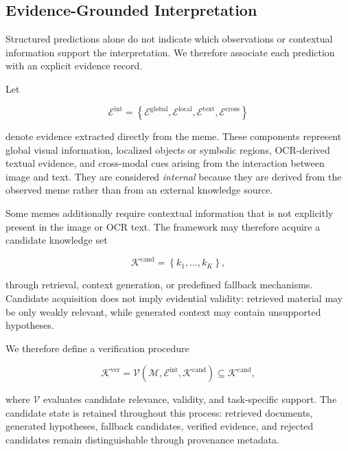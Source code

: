 \subsection{Evidence-Grounded Interpretation}
\label{sec:problem:evidence}

Structured predictions alone do not indicate which observations or
contextual information support the interpretation.
We therefore associate each prediction with an explicit evidence
record.

Let

\begin{equation}
\mathcal{E}^{\mathrm{int}}
=
\left\{
\mathcal{E}^{\mathrm{global}},
\mathcal{E}^{\mathrm{local}},
\mathcal{E}^{\mathrm{text}},
\mathcal{E}^{\mathrm{cross}}
\right\}
\label{eq:internal_evidence}
\end{equation}

denote evidence extracted directly from the meme.
These components represent global visual information, localized
objects or symbolic regions, OCR-derived textual evidence, and
cross-modal cues arising from the interaction between image and
text.
They are considered \emph{internal} because they are derived from
the observed meme rather than from an external knowledge source.

Some memes additionally require contextual information that is not
explicitly present in the image or OCR text.
The framework may therefore acquire a candidate knowledge set

\begin{equation}
\mathcal{K}^{\mathrm{cand}}
=
\left\{
k_1,\ldots,k_K
\right\},
\label{eq:knowledge_candidates}
\end{equation}

through retrieval, context generation, or predefined fallback
mechanisms.
Candidate acquisition does not imply evidential validity:
retrieved material may be only weakly relevant, while generated
context may contain unsupported hypotheses.

We therefore define a verification procedure

\begin{equation}
\mathcal{K}^{\mathrm{ver}}
=
\mathcal{V}
\left(
\mathcal{M},
\mathcal{E}^{\mathrm{int}},
\mathcal{K}^{\mathrm{cand}}
\right)
\subseteq
\mathcal{K}^{\mathrm{cand}},
\label{eq:verified_evidence}
\end{equation}

where $\mathcal{V}$ evaluates candidate relevance, validity, and
task-specific support.
The candidate state is retained throughout this process:
retrieved documents, generated hypotheses, fallback candidates,
verified evidence, and rejected candidates remain distinguishable
through provenance metadata.


